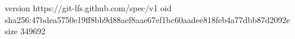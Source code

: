 version https://git-lfs.github.com/spec/v1
oid sha256:47bdea5750e19ff8bb9d88aef8aae67ef1bc60aadee818feb4a77dbb87d2092e
size 349692
